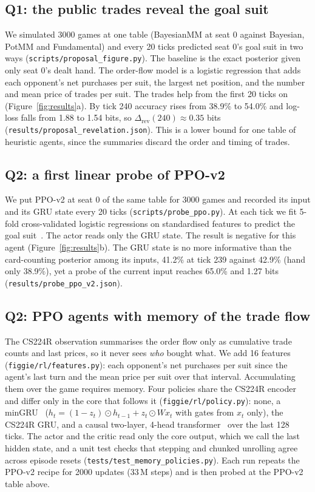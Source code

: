 \documentclass{article}
\newcommand{\file}[1]{{\small\texttt{#1}}}
\begin{document}
\subsection{Q1: the public trades reveal the goal suit}
We simulated 3000 games at one table (BayesianMM at seat 0 against Bayesian, PotMM and Fundamental) and every 20 ticks predicted seat 0's goal suit in two ways (\file{scripts/proposal\_figure.py}).
The baseline is the exact posterior given only seat 0's dealt hand. The order-flow model is a logistic regression that adds each opponent's net purchases per suit, the largest net position, and the number and mean price of trades per suit.
The trades help from the first 20 ticks on (Figure~\ref{fig:results}a). By tick 240 accuracy rises from 38.9\% to 54.0\% and log-loss falls from 1.88 to 1.54 bits, so $\Delta_{\text{rev}}(240)\approx 0.35$ bits (\file{results/proposal\_revelation.json}).
This is a lower bound for one table of heuristic agents, since the summaries discard the order and timing of trades.

\subsection{Q2: a first linear probe of PPO-v2}
We put PPO-v2 at seat 0 of the same table for 3000 games and recorded its input and its GRU state every 20 ticks (\file{scripts/probe\_ppo.py}). At each tick we fit 5-fold cross-validated logistic regressions on standardised features to predict the goal suit~\cite{probes}. The actor reads only the GRU state.
The result is negative for this agent (Figure~\ref{fig:results}b). The GRU state is no more informative than the card-counting posterior among its inputs, 41.2\% at tick 239 against 42.9\% (hand only 38.9\%), yet a probe of the current input reaches 65.0\% and 1.27 bits (\file{results/probe\_ppo\_v2.json}).

\subsection{Q2: PPO agents with memory of the trade flow}
\label{sec:memory}
The CS224R observation summarises the order flow only as cumulative trade counts and last prices, so it never sees \emph{who} bought what.
We add 16 features (\file{figgie/rl/features.py}): each opponent's net purchases per suit since the agent's last turn and the mean price per suit over that interval.
Accumulating them over the game requires memory.
Four policies share the CS224R encoder and differ only in the core that follows it (\file{figgie/rl/policy.py}): none, a minGRU~\cite{mingru} ($h_t=(1-z_t)\odot h_{t-1}+z_t\odot W x_t$ with gates from $x_t$ only), the CS224R GRU, and a causal two-layer, 4-head transformer~\cite{transformer} over the last 128 ticks.
The actor and the critic read only the core output, which we call the last hidden state, and a unit test checks that stepping and chunked unrolling agree across episode resets (\file{tests/test\_memory\_policies.py}).
Each run repeats the PPO-v2 recipe for 2000 updates (33\,M steps) and is then probed at the PPO-v2 table above.
\end{document}
